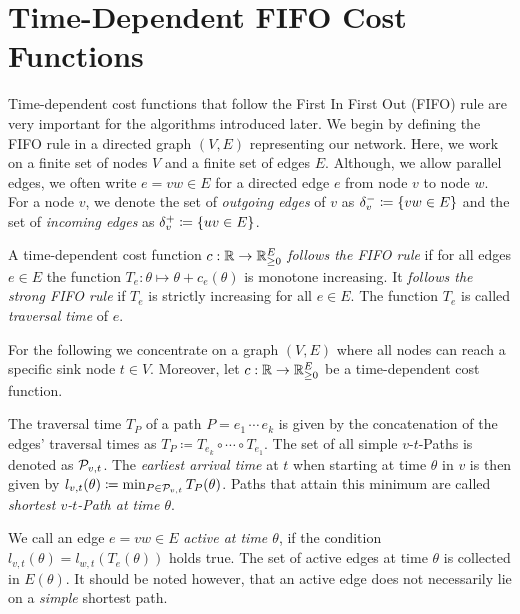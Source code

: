 \section{Time-Dependent FIFO Cost Functions}\label{sec:fifo-costs}

Time-dependent cost functions that follow the First In First Out (FIFO) rule are very important for the algorithms introduced later.
We begin by defining the FIFO rule in a directed graph $(V, E)$ representing our network.
Here, we work on a finite set of nodes $V$ and a finite set of edges $E$.
Although, we allow parallel edges, we often write $e=vw\in E$ for a directed edge $e$ from node $v$ to node $w$.
For a node $v$, we denote the set of \emph{outgoing edges} of $v$ as $\delta^-_{v}\coloneqq \{ vw \in E \}$ and the set of \emph{incoming edges} as $\delta^+_{v} \coloneqq \{ uv \in E \}$.


\begin{definition}
    A time-dependent cost function $c: \mathbb{R}\rightarrow \mathbb{R}_{\geq0}^E$ \emph{follows the FIFO rule} if for all edges $e\in E$ the function $T_e: \theta\mapsto \theta + c_e(\theta)$ is monotone increasing.
    It \emph{follows the strong FIFO rule} if $T_e$ is strictly increasing for all $e\in E$.
    The function $T_e$ is called \emph{traversal time} of $e$.
\end{definition}

For the following we concentrate on a graph $(V,E)$ where all nodes can reach a specific sink node $t\in V$.
Moreover, let $c:\mathbb{R}\rightarrow \mathbb{R}_{\geq0}^E$ be a time-dependent cost function.

The traversal time $T_P$ of a path $P = e_1\,\cdots\,e_k$ is given by the concatenation of the edges' traversal times as $T_P \coloneqq T_{e_k} \circ \cdots \circ T_{e_1}$.
The set of all simple $v$-$t$-Paths is denoted as $\mathcal{P}_{v,t}$.
The \emph{earliest arrival time} at $t$ when starting at time $\theta$ in $v$ is then given by $l_{v,t}(\theta)\coloneqq \min_{P\in\mathcal{P}_{v,t}} T_P(\theta)$.
Paths that attain this minimum are called \emph{shortest $v$-$t$-Path at time $\theta$}.

We call an edge $e=vw\in E$ \emph{active at time $\theta$}, if the condition $l_{v,t}(\theta) = l_{w,t}(T_e(\theta))$ holds true.
The set of active edges at time $\theta$ is collected in $E(\theta)$.
It should be noted however, that an active edge does not necessarily lie on a \emph{simple} shortest path.







